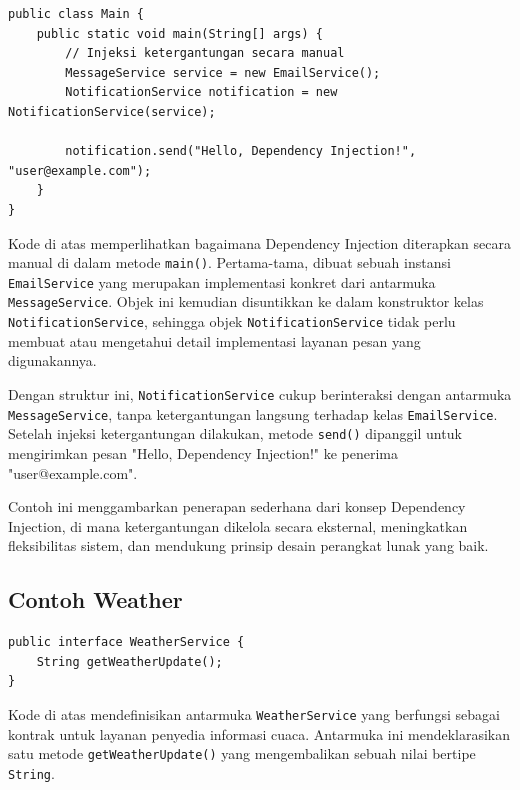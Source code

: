 \begin{lstlisting}[style=JavaStyle, caption={Kode Main untuk Menjalankan Dependency Injection}, label={lst:di-main}]
public class Main {
	public static void main(String[] args) {
		// Injeksi ketergantungan secara manual
		MessageService service = new EmailService();
		NotificationService notification = new NotificationService(service);
		
		notification.send("Hello, Dependency Injection!", "user@example.com");
	}
}
\end{lstlisting}

Kode di atas memperlihatkan bagaimana Dependency Injection diterapkan secara manual di dalam metode \texttt{main()}. Pertama-tama, dibuat sebuah instansi \texttt{EmailService} yang merupakan implementasi konkret dari antarmuka \texttt{MessageService}. Objek ini kemudian disuntikkan ke dalam konstruktor kelas \texttt{NotificationService}, sehingga objek \texttt{NotificationService} tidak perlu membuat atau mengetahui detail implementasi layanan pesan yang digunakannya.

Dengan struktur ini, \texttt{NotificationService} cukup berinteraksi dengan antarmuka \texttt{MessageService}, tanpa ketergantungan langsung terhadap kelas \texttt{EmailService}. Setelah injeksi ketergantungan dilakukan, metode \texttt{send()} dipanggil untuk mengirimkan pesan "Hello, Dependency Injection!" ke penerima "user@example.com".

Contoh ini menggambarkan penerapan sederhana dari konsep Dependency Injection, di mana ketergantungan dikelola secara eksternal, meningkatkan fleksibilitas sistem, dan mendukung prinsip desain perangkat lunak yang baik.

\subsection{Contoh Weather}

\begin{lstlisting}[style=JavaStyle, caption={Antarmuka WeatherService untuk Memberikan Informasi Cuaca}, label={lst:di-weather-service}]
public interface WeatherService {
	String getWeatherUpdate();
}
\end{lstlisting}

Kode di atas mendefinisikan antarmuka \texttt{WeatherService} yang berfungsi sebagai kontrak untuk layanan penyedia informasi cuaca. Antarmuka ini mendeklarasikan satu metode \texttt{getWeatherUpdate()} yang mengembalikan sebuah nilai bertipe \texttt{String}. 

